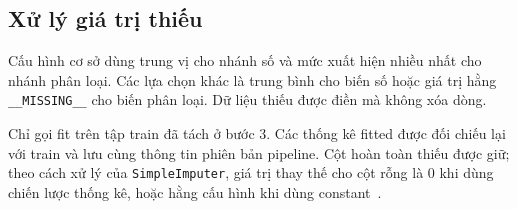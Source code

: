 \subsection{Xử lý giá trị thiếu}
\label{subsec:4_3_1}
Cấu hình cơ sở dùng trung vị cho nhánh số và mức xuất hiện nhiều nhất cho nhánh phân loại. Các lựa chọn khác là trung bình cho biến số hoặc giá trị hằng \texttt{\_\_MISSING\_\_} cho biến phân loại. Dữ liệu thiếu được điền mà không xóa dòng.

Chỉ gọi fit trên tập train đã tách ở bước 3. Các thống kê fitted được đối chiếu lại với train và lưu cùng thông tin phiên bản pipeline. Cột hoàn toàn thiếu được giữ; theo cách xử lý của \texttt{SimpleImputer}, giá trị thay thế cho cột rỗng là 0 khi dùng chiến lược thống kê, hoặc hằng cấu hình khi dùng constant~\cite{sklearn-imputer}.
